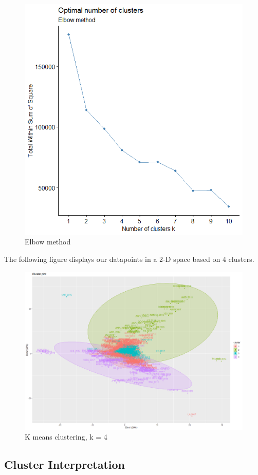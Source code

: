 \documentclass[11pt,]{article}
\begin{document}
\begin{figure}

{\centering \includegraphics[width=0.6\linewidth,height=0.4\textheight]{unsupervised_elbow} 

}

\caption{Elbow method}\label{fig:elbow}
\end{figure}

The following figure displays our datapoints in a 2-D space based on 4
clusters.

\begin{figure}
\includegraphics[width=1\linewidth,height=0.7\textheight]{cluster_image} \caption{K means clustering, k = 4}\label{fig:cluster}
\end{figure}

\hypertarget{cluster-interpretation}{%
\subsection{Cluster Interpretation}\label{cluster-interpretation}}
\end{document}
